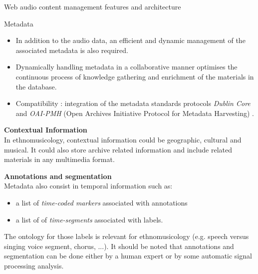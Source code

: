 \documentclass[final, hyperref, table]{beamer}
\begin{document}
\begin{frame}[containsverbatim]{}
\begin{columns}[t]
\begin{column}[T]{.49\linewidth}
\begin{block}{Web audio content management features and architecture}
\end{block}
\begin{block}{Metadata}\small
  \begin{itemize}
  \item In addition to the audio data, an efficient and dynamic
    management of the associated metadata is also required.
  \item Dynamically handling metadata in a collaborative manner optimises
    the continuous process of knowledge gathering and enrichment of
    the materials in the database.
  \item Compatibility : integration of the metadata standards protocols \emph{Dublin Core}
    and \emph{OAI-PMH} (Open Archives Initiative Protocol for Metadata
    Harvesting) \cite{DublinCore,OAI-PMH}.
  \end{itemize}

\textbf{Contextual Information}\\
In ethnomusicology, contextual information could be geographic, cultural and musical. It could also store archive related information and include related materials in any multimedia format. 

\textbf{Annotations and segmentation}\\
Metadata also consist in temporal information such as:
\begin{itemize}
\item a list of \emph{time-coded markers} associated with annotations
\item a list of of \emph{time-segments} associated with labels.
\end{itemize}
The ontology for those labels is relevant for ethnomusicology (e.g. speech versus singing voice segment, chorus, ...).
It should be noted that annotations and segmentation can be done either by a human expert or by some automatic signal processing analysis.

\end{block}
    \end{column}
   

\end{columns}
\end{frame}
\end{document}
